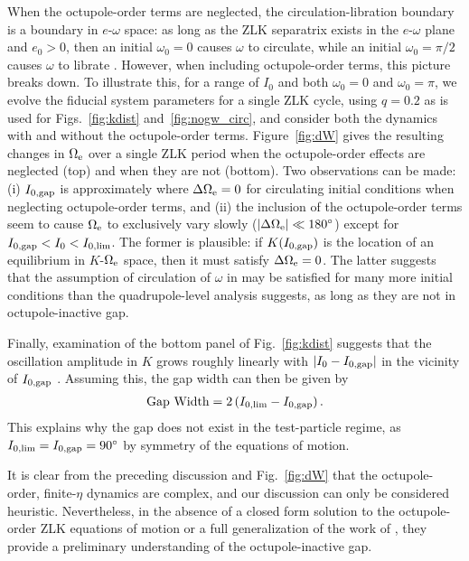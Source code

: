 \documentclass[
        fleqn,
        usenatbib,
    ]{mnras}
\newcommand*{\abs}[1]{\left|#1\right|}
\newcommand*{\p}[1]{\left(#1\right)}
\begin{document}
When the octupole-order terms are neglected, the circulation-libration
boundary is a boundary in $e$-$\omega$ space: as long as the ZLK separatrix
exists in the $e$-$\omega$ plane and $e_0 > 0$, then an initial $\omega_0 = 0$
causes $\omega$ to circulate, while an initial $\omega_0 = \pi/2$ causes
$\omega$ to librate \citep[e.g.,][]{kinoshita, shevchenko2016lidov}. However,
when including octupole-order terms, this picture breaks down. To illustrate
this, for a range of $I_0$ and both $\omega_0 = 0$ and $\omega_0 = \pi$, we
evolve the fiducial system parameters for a single ZLK cycle, using $q = 0.2$ as
is used for Figs.~\ref{fig:kdist} and~\ref{fig:nogw_circ}, and consider both the
dynamics with and without the octupole-order terms. Figure~\ref{fig:dW} gives
the resulting changes in $\Omega_{\rm e}$ over a single ZLK period when the
octupole-order effects are neglected (top) and when they are not (bottom). Two
observations can be made: (i) $I_{\rm 0, gap}$ is approximately where $\Delta
\Omega_{\rm e} = 0$ for circulating initial conditions when neglecting
octupole-order terms, and (ii) the inclusion of the octupole-order terms seem to
cause $\Omega_{\rm e}$ to exclusively vary slowly ($\abs{\Delta \Omega_{\rm e}}
\ll 180^\circ$) except for $I_{\rm 0, gap} < I_0 < I_{0, \lim}$. The former is
plausible: if $K(I_{\rm 0, gap})$ is the location of an equilibrium in
$K$-$\Omega_{\rm e}$ space, then it must satisfy $\Delta \Omega_{\rm e} = 0$.
The latter suggests that the assumption of circulation of $\omega$ in
\citet{katz2011long} may be satisfied for many more initial conditions than the
quadrupole-level analysis suggests, as long as they are not in octupole-inactive
gap.

Finally, examination of the bottom panel of Fig.~\ref{fig:kdist} suggests that
the oscillation amplitude in $K$ grows roughly linearly with $\abs{I_0 - I_{\rm
0, gap}}$ in the vicinity of $I_{\rm 0, gap}$ \citep[this may be because, in the
test-particle limit, librating $\omega$ give oscillation amplitudes in $K$ that
are higher-order in $K$ and $\Omega_{\rm e}$, as pointed out
by][]{katz2011long}. Assuming this, the gap width can then be given by
\begin{align}
    \text{Gap Width} = 2\p{I_{0, \lim} - I_{\rm 0, gap}}.
\end{align}
This explains why the gap does not exist in the test-particle regime, as $I_{0,
\lim} = I_{\rm 0, gap} = 90^\circ$ by symmetry of the equations of motion.

It is clear from the preceding discussion and Fig.~\ref{fig:dW} that the
octupole-order, finite-$\eta$ dynamics are complex, and our discussion can only
be considered heuristic. Nevertheless, in the absence of a closed form solution
to the octupole-order ZLK equations of motion or a full generalization of the
work of \citet{katz2011long}, they provide a preliminary understanding of the
octupole-inactive gap.
\end{document}
